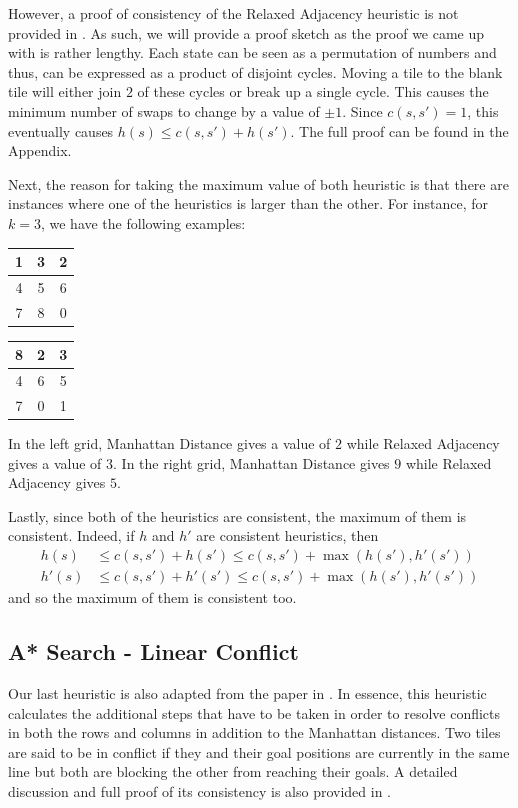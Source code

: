 \documentclass[runningheads]{llncs}
\begin{document}
However, a proof of consistency of the Relaxed Adjacency heuristic is not provided in \cite{ref_2}. As such, we will provide a proof sketch as the proof we came up with is rather lengthy. Each state can be seen as a permutation of numbers and thus, can be expressed as a product of disjoint cycles. Moving a tile to the blank tile will either join $2$ of these cycles or break up a single cycle. This causes the minimum number of swaps to change by a value of $\pm 1$. Since $c(s, s') = 1$, this eventually causes $h(s) \leq c(s, s') + h(s')$. The full proof can be found in the Appendix.

Next, the reason for taking the maximum value of both heuristic is that there are instances where one of the heuristics is larger than the other. For instance, for $k = 3$, we have the following examples:
\begin{center}
    \begin{tabular}{| c | c | c |}
        \hline
        1 & 3 & 2 \\
        \hline
        4 & 5 & 6 \\
        \hline
        7 & 8 & 0 \\
        \hline
    \end{tabular}
    \quad
    \begin{tabular}{| c | c | c |}
        \hline
        8 & 2 & 3 \\
        \hline
        4 & 6 & 5 \\
        \hline
        7 & 0 & 1 \\
        \hline
    \end{tabular}
\end{center}

In the left grid, Manhattan Distance gives a value of $2$ while Relaxed Adjacency gives a value of $3$. In the right grid, Manhattan Distance gives $9$ while Relaxed Adjacency gives $5$.

Lastly, since both of the heuristics are consistent, the maximum of them is consistent. Indeed, if $h$ and $h'$ are consistent heuristics, then
\begin{align*}
    h(s) & \leq c(s, s') + h(s') \leq c(s, s') + \max (h(s'), h'(s'))\\
    h'(s) & \leq c(s, s') + h'(s') \leq c(s, s') + \max (h(s'), h'(s')) 
\end{align*}
and so the maximum of them is consistent too.

\subsection{A* Search - Linear Conflict}
Our last heuristic is also adapted from the paper in \cite{ref_2}. In essence, this heuristic calculates the additional steps that have to be taken in order to resolve conflicts in both the rows and columns in addition to the Manhattan distances. Two tiles are said to be in conflict if they and their goal positions are currently in the same line but both are blocking the other from reaching their goals. A detailed discussion and full proof of its consistency is also provided in \cite{ref_2}.
\end{document}
